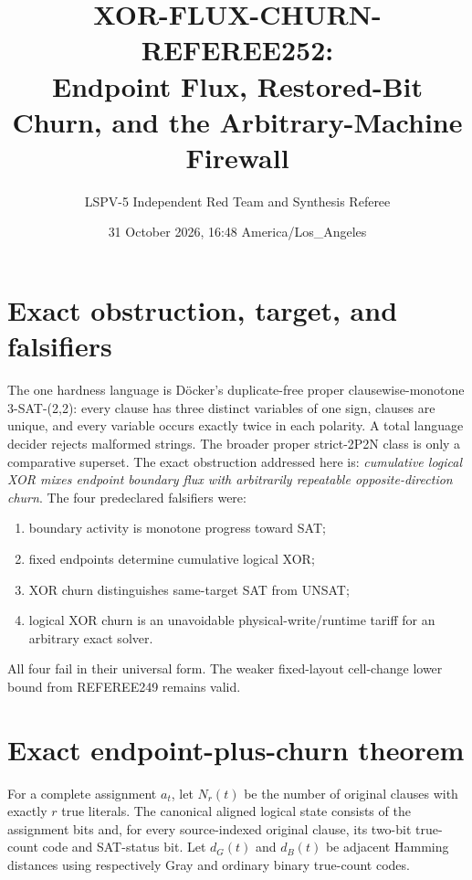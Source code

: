 \documentclass[11pt]{article}
\title{XOR-FLUX-CHURN-REFEREE252:\\Endpoint Flux, Restored-Bit Churn, and the Arbitrary-Machine Firewall}
\author{LSPV-5 Independent Red Team and Synthesis Referee}
\date{31 October 2026, 16:48 America/Los\_Angeles}
\begin{document}
\maketitle

\begin{center}
\end{center}

\section{Exact obstruction, target, and falsifiers}
The one hardness language is D\"ocker's duplicate-free proper clausewise-monotone
3-SAT-(2,2): every clause has three distinct variables of one sign, clauses are
unique, and every variable occurs exactly twice in each polarity.  A total
language decider rejects malformed strings.  The broader proper strict-2P2N
class is only a comparative superset.  The exact obstruction addressed here is:
\emph{cumulative logical XOR mixes endpoint boundary flux with arbitrarily
repeatable opposite-direction churn}.  The four predeclared falsifiers were:
\begin{enumerate}
\item[F1.] boundary activity is monotone progress toward SAT;
\item[F2.] fixed endpoints determine cumulative logical XOR;
\item[F3.] XOR churn distinguishes same-target SAT from UNSAT;
\item[F4.] logical XOR churn is an unavoidable physical-write/runtime tariff
for an arbitrary exact solver.
\end{enumerate}
All four fail in their universal form.  The weaker fixed-layout cell-change
lower bound from REFEREE249 remains valid.

\section{Exact endpoint-plus-churn theorem}
For a complete assignment $a_t$, let $N_r(t)$ be the number of original clauses
with exactly $r$ true literals.  The canonical aligned logical state consists of
the assignment bits and, for every source-indexed original clause, its two-bit
true-count code and SAT-status bit.  Let $d_G(t)$ and $d_B(t)$ be adjacent
Hamming distances using respectively Gray and ordinary binary true-count codes.
\end{document}

